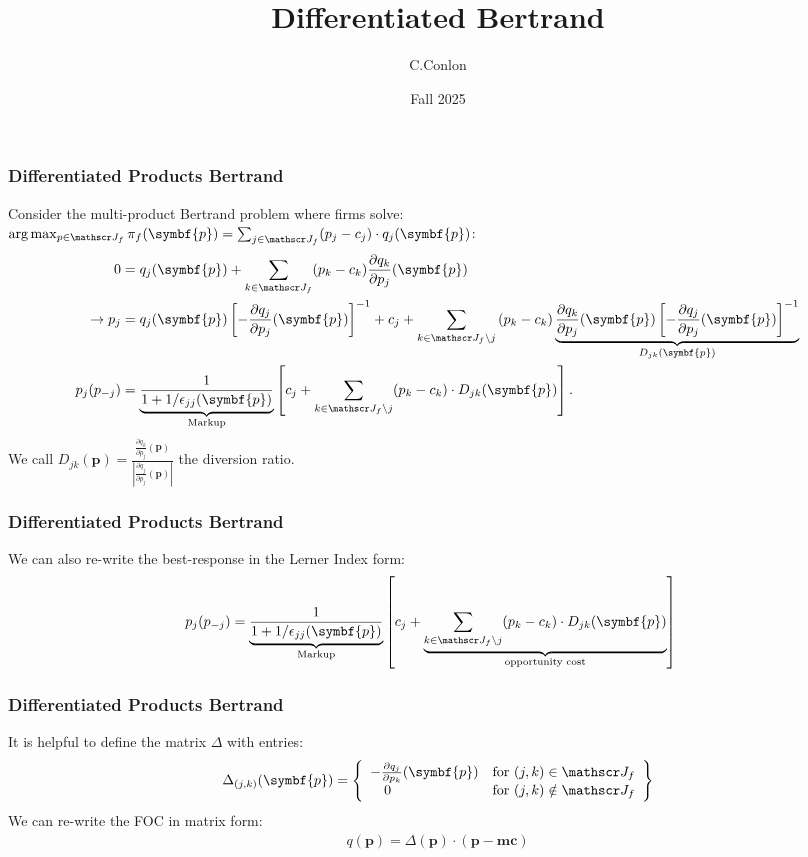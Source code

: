 \documentclass[aspectratio=169,11pt]{beamer}
\title{Differentiated Bertrand}
\author{C.Conlon}
\institute{Grad IO }
\date{Fall 2025}
\begin{document}
\frame{\titlepage}

\begin{frame}
\frametitle{Differentiated Products Bertrand}
\small
Consider the multi-product Bertrand problem where firms solve: $\arg \max_{p \in \calJ_f} \pi_f (\symbf{p}) = \sum_{j \in \calJ_f} (p_j - c_j) \cdot q_j(\symbf{p})$:
\begin{align*}
 0&= q_j(\symbf{p}) + \sum_{k \in \calJ_f} (p_k - c_k) \frac{\partial q_{k}}{\partial p_j}(\symbf{p}) \\
\rightarrow p_j &=q_{j}(\symbf{p}) \left[-\frac{\partial q_{j}}{\partial p_{j}}(\symbf{p})\right]^{-1} + c_{j} + \sum_{k \in \calJ_{f} \setminus j} \left(p_{k}-c_{k}\right) \underbrace{\frac{\partial q_{k}}{\partial p_{j}}(\symbf{p})\left[-\frac{\partial q_{j}}{\partial p_{j}}(\symbf{p})\right]^{-1}}_{D_{jk}(\symbf{p})}\\
p_j(p_{-j}) &= \underbrace{\frac{1}{1+1/\epsilon_{jj}(\symbf{p})}}_{\text{Markup}} \left[ c_j + \sum_{k \in \calJ_{f} \setminus j}  (p_k-c_k) \cdot  D_{jk} (\symbf{p}) \right].
\end{align*}
We call $D_{jk}(\symbf{p}) = \frac{\frac{\partial q_{k}}{\partial p_j}(\symbf{p})}{\left| \frac{\partial q_{j}}{\partial p_j}(\symbf{p}) \right|}$ the \alert{diversion ratio}.
\end{frame}

\begin{frame}
\frametitle{Differentiated Products Bertrand}
We can also re-write the best-response in the Lerner Index form:
\begin{align*}
p_j(p_{-j}) &= \underbrace{\frac{1}{1+1/\epsilon_{jj}(\symbf{p})}}_{\text{Markup}} \left[c_j + \underbrace{\sum_{k \in \calJ_{f} \setminus j}  (p_k-c_k) \cdot  D_{jk} (\symbf{p}) }_{\text{opportunity cost}}\right]
\end{align*}

\end{frame}


\begin{frame}
\frametitle{Differentiated Products Bertrand}
It is helpful to define the matrix $\Delta$ with entries:
\begin{eqnarray*}
\Delta_{(j,k)}(\symbf{p}) = \left\{\begin{array}{lr}
         - \frac{\partial q_{j}}{\partial p_k}(\symbf{p}) & \text{for }  (j,k) \in \calJ_f\\
       	  \quad 0 & \text{for } (j,k) \notin \calJ_f
        \end{array} \right\}
\end{eqnarray*}
We can re-write the FOC in matrix form:
\begin{eqnarray*}
q(\symbf{p}) = \Delta(\symbf{p})\cdot(\symbf{p}-\symbf{mc})
\end{eqnarray*}
\end{frame}
\end{document}
